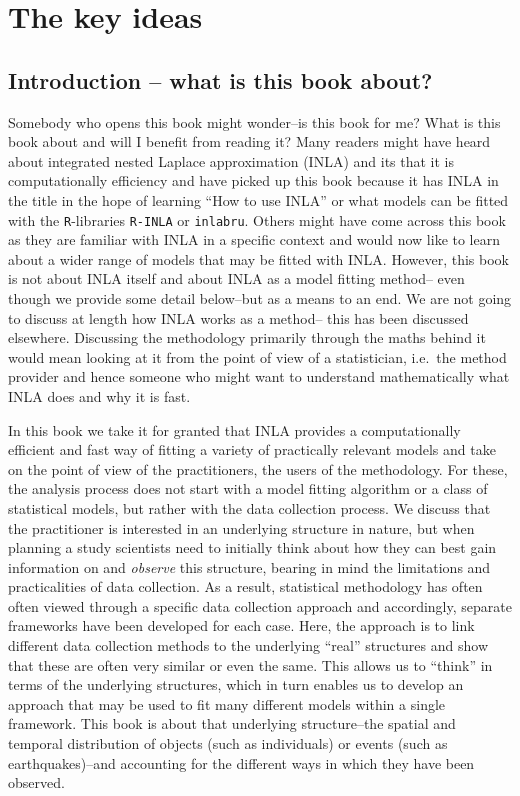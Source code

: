 
\chapter{The key ideas}


\section{Introduction -- what is this book about?}
Somebody who opens this book might wonder--is this book for me? What is this book about and will I benefit from reading it? Many readers might have heard about integrated nested Laplace approximation (INLA) and its that it is computationally efficiency and have picked up this book because it has INLA in the title in the hope of 
learning ``How to use INLA'' or what models can be fitted with the \texttt{R}-libraries \texttt{R-INLA} or \texttt{inlabru}. Others might have come across this book as they are familiar with INLA in a specific context and would now like to learn about a wider range of models that may be fitted with INLA. However, this book is not about INLA itself and about INLA as a model fitting method-- even though we provide some detail below--but as a means to an end. We are not going to discuss at length how INLA works as a method-- this has been discussed elsewhere. Discussing the methodology primarily through the maths behind it would mean looking at it from the point of view of a statistician, i.e.\ the method provider and hence someone who might want to understand mathematically what INLA does and why it is fast. 

In this book we take it for granted that INLA provides a computationally efficient and fast way of fitting a variety of practically relevant models and take on the point of view of the practitioners, the users of the methodology. For these, the analysis process does not start with a model fitting algorithm or a class of statistical models, but rather with the data collection process.  We discuss that the practitioner is interested in an underlying structure in nature, but when planning a study scientists need to initially think about how they can best gain information on and \textit{observe} this structure, bearing in mind the limitations and practicalities of data collection. As a result, statistical methodology has often often viewed through a specific data collection approach and accordingly, separate frameworks have been developed for each case. Here, the approach is to link different data collection methods to the underlying ``real'' structures and show that these are often very similar or even the same. This allows us to ``think'' in terms of the underlying structures, which in turn enables us to develop an approach that may be used to fit many different models within a single framework. This book is about that underlying structure--the spatial and temporal distribution of objects (such as individuals) or events (such as earthquakes)--and accounting for the different ways in which they have been observed.

